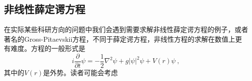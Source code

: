 
\begin{issues}
\issueTODO
\end{issues}

\subsection{非线性薛定谔方程}
在实际某些科研方向的问题中我们会遇到需要求解非线性薛定谔方程的例子，或者著名的Gross-Pitaevskii方程，不同于薛定谔方程，非线性方程的求解在数值上更有难度。方程的一般形式是
\begin{equation}
i \frac{\partial}{\partial t} \psi = -\frac{1}{2}\nabla^2 \psi + g |\psi|^2 \psi + V(r)\psi~,
\end{equation}
其中的$V(r)$是外势。读者可能会考虑
